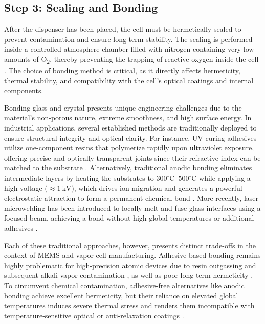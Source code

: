 \subsection*{Step 3: Sealing and Bonding}
After the dispenser has been placed, the cell must be hermetically sealed to prevent 
contamination and ensure long-term stability. The sealing is performed inside a 
controlled-atmosphere chamber filled with nitrogen containing very low amounts of 
O\textsubscript{2}, thereby preventing the trapping of reactive oxygen inside the 
cell \cite{lucivero2022}. The choice of bonding method is critical, as it directly 
affects hermeticity, thermal stability, and compatibility with the cell's optical 
coatings and internal components.

Bonding glass and crystal presents unique engineering challenges due to the 
material's non-porous nature, extreme smoothness, and high surface energy. In 
industrial applications, several established methods are traditionally deployed to 
ensure structural integrity and optical clarity. For instance, UV-curing adhesives 
utilize one-component resins that polymerize rapidly upon ultraviolet exposure, 
offering precise and optically transparent joints since their refractive index can 
be matched to the substrate \cite{paschotta2023}. Alternatively, traditional 
anodic bonding eliminates intermediate layers by heating the substrates to 
$300^{\circ}\text{C}$--$500^{\circ}\text{C}$ while applying a high voltage 
($\approx 1~\text{kV}$), which drives ion migration and generates a powerful 
electrostatic attraction to form a permanent chemical bond \cite{wallis1974}. More 
recently, laser microwelding has been introduced to locally melt and fuse glass 
interfaces using a focused beam, achieving a bond without high global temperatures 
or additional adhesives \cite{wlodarczyk2019}.

Each of these traditional approaches, however, presents distinct trade-offs in the 
context of \gls{MEMS} and vapor cell manufacturing. Adhesive-based bonding remains 
highly problematic for high-precision atomic devices due to resin outgassing and 
subsequent alkali vapor contamination \cite{knapkiewicz2018}, as well as poor 
long-term hermeticity \cite{karlen2018}. To circumvent chemical contamination, 
adhesive-free alternatives like anodic bonding achieve excellent hermeticity, but 
their reliance on elevated global temperatures induces severe thermal stress and 
renders them incompatible with temperature-sensitive optical or anti-relaxation 
coatings \cite{wang2025}. 


